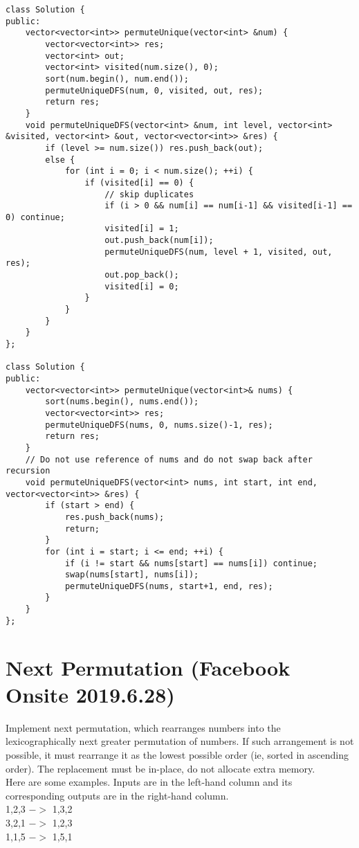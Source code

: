 \begin{lstlisting}
class Solution {
public:
    vector<vector<int>> permuteUnique(vector<int> &num) {
        vector<vector<int>> res;
        vector<int> out;
        vector<int> visited(num.size(), 0);
        sort(num.begin(), num.end());
        permuteUniqueDFS(num, 0, visited, out, res);
        return res;
    }
    void permuteUniqueDFS(vector<int> &num, int level, vector<int> &visited, vector<int> &out, vector<vector<int>> &res) {
        if (level >= num.size()) res.push_back(out);
        else {
            for (int i = 0; i < num.size(); ++i) {
                if (visited[i] == 0) {
                    // skip duplicates
                    if (i > 0 && num[i] == num[i-1] && visited[i-1] == 0) continue;
                    visited[i] = 1;
                    out.push_back(num[i]);
                    permuteUniqueDFS(num, level + 1, visited, out, res);
                    out.pop_back();
                    visited[i] = 0;
                }
            }
        }
    }
};

class Solution {
public:
    vector<vector<int>> permuteUnique(vector<int>& nums) {
        sort(nums.begin(), nums.end());
        vector<vector<int>> res;
        permuteUniqueDFS(nums, 0, nums.size()-1, res);
        return res;
    }
    // Do not use reference of nums and do not swap back after recursion
    void permuteUniqueDFS(vector<int> nums, int start, int end, vector<vector<int>> &res) {
        if (start > end) {
            res.push_back(nums);
            return;
        }
        for (int i = start; i <= end; ++i) {
            if (i != start && nums[start] == nums[i]) continue;
            swap(nums[start], nums[i]);
            permuteUniqueDFS(nums, start+1, end, res);
        }
    }
};
\end{lstlisting}


\section{Next Permutation (Facebook Onsite 2019.6.28)}
Implement next permutation, which rearranges numbers into the lexicographically next greater permutation of numbers. If such arrangement is not possible, it must rearrange it as the lowest possible order (ie, sorted in ascending order). The replacement must be in-place, do not allocate extra memory.\\

Here are some examples. Inputs are in the left-hand column and its corresponding outputs are in the right-hand column.\\
1,2,3 $->$ 1,3,2\\
3,2,1 $->$ 1,2,3\\
1,1,5 $->$ 1,5,1\\

